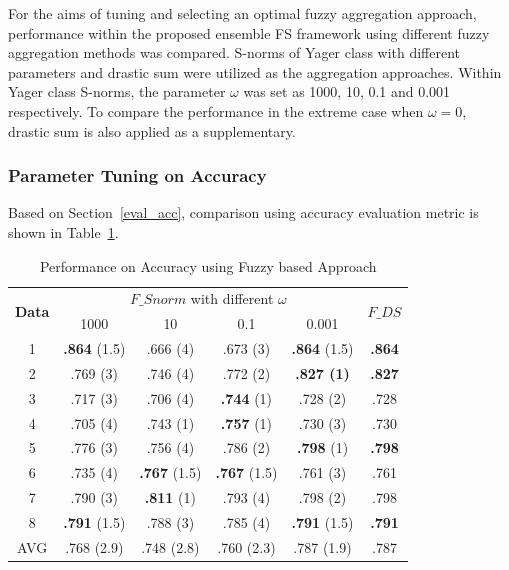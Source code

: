 \documentclass[conference]{IEEEtran}
\begin{document}
For the aims of tuning and selecting an optimal fuzzy aggregation approach, performance within the proposed ensemble FS framework using different fuzzy aggregation methods was compared. S-norms of Yager class with different parameters and drastic sum were utilized as the aggregation approaches. Within Yager class S-norms, the parameter $\omega$ was set as 1000, 10, 0.1 and 0.001 respectively. To compare the performance in the extreme case when $\omega = 0$, drastic sum is also applied as a supplementary.

\subsubsection{\textbf{Parameter Tuning on Accuracy}}
Based on Section~\ref{eval_acc}, comparison using accuracy evaluation metric is shown in Table~\ref{fuzzy_acc}.

\begin{table}[h]\scriptsize
	\centering
	\caption{Performance on Accuracy using Fuzzy based Approach}
		\begin{tabular}{c|c c c c |c}
			\toprule
			\multirow{2}{*}{\textbf{Data}}   & \multicolumn{4}{c|}{$F\_{Snorm}$ with different $\omega$}   & \multirow{2}{*}{$F\_{DS}$}  \\
		& 1000  & 10    & 0.1   & 0.001   &    \\ 
		\midrule
		1                              & \textbf{.864} (1.5) & .666 (4) & .673 (3) & \textbf{.864}  (1.5)   & \textbf{.864}   \\ 
		2                              & .769 (3) & .746 (4) & .772 (2) & \textbf{.827 (1)}   & \textbf{.827 }  \\ 
		3                              & .717 (3) & .706 (4) & \textbf{.744} (1) & .728  (2)       & .728   \\ 
		4                              & .705 (4) & .743 (1) & \textbf{.757} (1) & .730 (3)         & .730          \\ 
		5                              & .776 (3) & .756 (4) & .786 (2) & \textbf{.798}  (1)      & \textbf{.798}         \\ 
		6                              & .735 (4) & \textbf{.767} (1.5) & \textbf{.767} (1.5) & .761  (3)       & .761      \\ 
		7                              & .790 (3) & \textbf{.811} (1) & .793 (4) & .798 (2)        & .798    \\ 
		8                              & \textbf{.791} (1.5) & .788 (3) & .785 (4) & \textbf{.791} (1.5)      & \textbf{.791}   \\ 
		\midrule
		AVG                       & .768 (2.9) & .748 (2.8) & .760 (2.3) & .787 (1.9)      & .787   \\
		\bottomrule
	\end{tabular}
	\label{fuzzy_acc}
\end{table}
\end{document}
